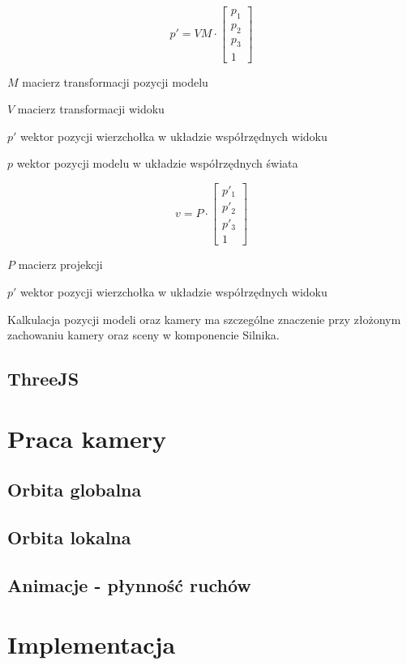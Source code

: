 \begin{equation}
    \label{eq:MV}
    p' = VM \cdot \begin{bmatrix}
        p_{1} \\
        p_{2} \\
        p_{3} \\ 
        1
      \end{bmatrix}
\end{equation}
\begin{eqexpl}[25mm]
    \item{$M$} macierz transformacji pozycji modelu
    \item{$V$} macierz transformacji widoku
    \item{$p'$} wektor pozycji wierzchołka w układzie współrzędnych widoku
    \item{$p$} wektor pozycji modelu w układzie współrzędnych świata
\end{eqexpl}

\begin{equation}
\label{eq:MVP}
    v = P \cdot \begin{bmatrix}
        p'_{1} \\
        p'_{2} \\
        p'_{3} \\ 
        1
      \end{bmatrix}
\end{equation}
\begin{eqexpl}[25mm]
    \item{$P$} macierz projekcji
    \item{$p'$} wektor pozycji wierzchołka w układzie współrzędnych widoku
\end{eqexpl}
\vspace{\baselineskip}
Kalkulacja pozycji modeli oraz kamery ma szczególne znaczenie przy złożonym zachowaniu kamery oraz sceny w komponencie Silnika.

\subsection{ThreeJS}

\section{Praca kamery}

\subsection{Orbita globalna}

\subsection{Orbita lokalna}

\subsection{Animacje - płynność ruchów}

\section{Implementacja}